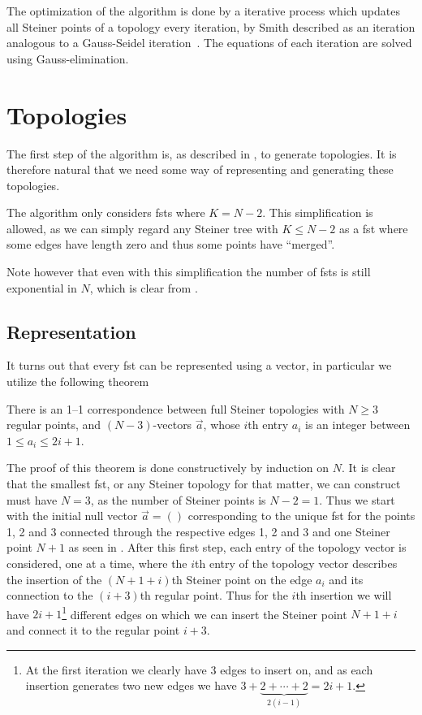 The optimization of the algorithm is done by a iterative process which updates
all Steiner points of a topology every iteration, by Smith described as an
iteration analogous to a Gauss-Seidel iteration~\cite[p.~145]{Smith1992}. The
equations of each iteration are solved using Gauss-elimination.


\section{Topologies}
\label{sec:topologies}

The first step of the algorithm is, as described in , to
generate topologies. It is therefore natural that we need some way of
representing and generating these topologies.

The algorithm only considers \glspl{fst} where $K = N - 2$. This simplification
is allowed, as we can simply regard any Steiner tree with $K \le N - 2$ as a
\gls{fst} where some edges have length zero and thus some points have
``merged''.

Note however that even with this simplification the number of \glspl{fst} is
still exponential in $N$, which is clear from .

\subsection{Representation}
\label{sec:representation}

It turns out that every \gls{fst} can be represented using a vector, in
particular we utilize the following theorem

\begin{theorem}
There is an 1--1 correspondence between full Steiner topologies with $N \ge 3$
regular points, and $(N-3)$-vectors $\vec{a}$, whose $i$th entry $a_i$ is an
integer between $1 \le a_i \le 2 i + 1$.
\end{theorem}

The proof of this theorem is done constructively by induction on $N$. It is
clear that the smallest \gls{fst}, or any Steiner topology for that matter, we
can construct must have $N = 3$, as the number of Steiner points is $N - 2 = 1$.
Thus we start with the initial null vector $\vec{a} = ()$ corresponding to the
unique \gls{fst} for the points 1, 2 and 3 connected through the respective
edges 1, 2 and 3 and one Steiner point $N+1$ as seen in
. After this first step, each entry of the
topology vector is considered, one at a time, where the $i$th entry of the
topology vector describes the insertion of the $(N+1+i)$th Steiner point on the
edge $a_{i}$ and its connection to the $(i+3)$th regular point. Thus for the
$i$th insertion we will have $2i+1$\footnote{At the first iteration we clearly
  have 3 edges to insert on, and as each insertion generates two new edges we
  have $3 + \underbrace{2 + \cdots + 2}_{2 (i - 1)} = 2 i + 1$.} different edges
on which we can insert the Steiner point $N+1+i$ and connect it to the regular
point $i+3$.


